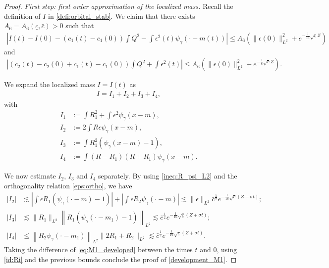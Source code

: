 \documentclass[reqno,10pt]{amsart}
\numberwithin{equation}{section}
\begin{document}
	\begin{proof}
		
		\textit{First step: first order approximation of the localized mass.} Recall the definition of $I$ in \eqref{defi:orbital_stab}. We claim that there exists $A_6 = A_6(\underline{c}, \bar{c})>0$ such that 
		\begin{align}\label{development_M1}
			\left\vert I(t) - I(0) - \left( c_1(t) -c_1(0) \right) \int Q^2 - \int \epsilon^2(t)\psi_\gamma(\cdot-m(t)) \right\vert \leq A_6 \left( \| \epsilon(0) \|_{L^2}^2 + e^{-\frac1{16} \sqrt{\underline{c}} Z} \right)
		\end{align}
   and
   \begin{align}\label{development_M2}
			\left\vert \left( c_2(t) -c_2(0) + c_1(t) -c_1(0) \right) \int Q^2 + \int \epsilon^2(t) \right\vert \leq A_6 \left( \| \epsilon (0) \|_{L^2}^2 + e^{- \frac18 \sqrt{\underline{c}} Z} \right).
		\end{align}
		
		We expand the localized mass $I=I(t)$ as
		\begin{align}\label{eq:M1_developed}
			I = I_1 + I_2 + I_3 + I_4, 
		\end{align}
		with
		\begin{align*}
			 I_1 &:= \int R_1^2+\int \epsilon^2 \psi_\gamma (x-m), \\  
             I_2 &:= 2\int R\epsilon \psi_\gamma (x-m), \\ 
             I_3 &:= \int R_1^2 \left( \psi_\gamma(x-m)-1\right), \\
			 I_4 &:= \int (R-R_1)(R+R_1) \psi_\gamma(x -m).
		\end{align*}
		
		We now estimate $I_2$, $I_3$ and $I_4$ separately. By using \eqref{ineq:R_psi_L2} and  the orthogonality relation \eqref{eps:ortho}, we have
		\begin{align*}
			\left\vert I_2 \right\vert 
			& \lesssim \left\vert  \int \epsilon R_1 \left( \psi_\gamma(\cdot -m) -1\right) \right\vert + \left\vert  \int \epsilon R_2 \psi_\gamma(\cdot-m) \right\vert  \lesssim \| \epsilon \|_{L^2} \bar{c}^\frac12 e^{-\frac1{16}\sqrt{\underline{c}}\left( Z+ \sigma t\right)}; \\
			\left\vert I_3 \right\vert & \lesssim \| R_1 \|_{L^2} \left\| R_1 \left( \psi_\gamma \left( \cdot -m_1\right)-1 \right) \right\|_{L^2} \lesssim \bar{c}^{\frac12} e^{- \frac1{16} \sqrt{\underline{c}}\left( Z + \sigma t\right)}; \\
			\left\vert I_4 \right\vert &\leq \left\| R_2 \psi_\gamma \left( \cdot -m_1 \right) \right\|_ {L^2} \| 2R_1 + R_2 \|_{L^2} \lesssim \bar{c}^{\frac12} e^{- \frac1{16} \sqrt{\underline{c}}\left( Z + \sigma t\right)}.
		\end{align*}
		Taking the difference of \eqref{eq:M1_developed} between the times $t$ and $0$, using \eqref{id:Ri} and the previous bounds conclude the proof of \eqref{development_M1}. 
   

\end{proof}
\end{document}
